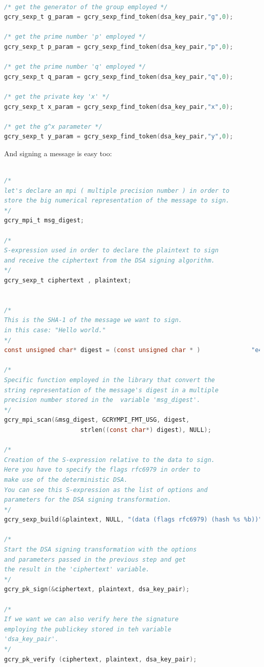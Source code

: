 \documentclass[11pt,english]{article}
\begin{document}
\begin{lstlisting}[language=c]

/* get the generator of the group employed */
gcry_sexp_t g_param = gcry_sexp_find_token(dsa_key_pair,"g",0);

/* get the prime number 'p' employed */
gcry_sexp_t p_param = gcry_sexp_find_token(dsa_key_pair,"p",0); 

/* get the prime number 'q' employed */
gcry_sexp_t q_param = gcry_sexp_find_token(dsa_key_pair,"q",0);

/* get the private key 'x' */
gcry_sexp_t x_param = gcry_sexp_find_token(dsa_key_pair,"x",0);

/* get the g^x parameter */
gcry_sexp_t y_param = gcry_sexp_find_token(dsa_key_pair,"y",0);

\end{lstlisting}

And signing a message is easy too:

\begin{lstlisting}[language=c]

/* 
let's declare an mpi ( multiple precision number ) in order to 
store the big numerical representation of the message to sign.
*/
gcry_mpi_t msg_digest;

/*
S-expression used in order to declare the plaintext to sign
and receive the ciphertext from the DSA signing algorithm.
*/
gcry_sexp_t ciphertext , plaintext;


/* 
This is the SHA-1 of the message we want to sign. 
in this case: "Hello world."
*/    
const unsigned char* digest = (const unsigned char * )         		"e44f3364019d18a151cab7072b5a40bb5b3e274f";
    
/*
Specific function employed in the library that convert the 
string representation of the message's digest in a multiple 
precision number stored in the  variable 'msg_digest'.
*/    
gcry_mpi_scan(&msg_digest, GCRYMPI_FMT_USG, digest, 
                     strlen((const char*) digest), NULL);

/*
Creation of the S-expression relative to the data to sign.
Here you have to specify the flags rfc6979 in order to 
make use of the deterministic DSA.
You can see this S-expression as the list of options and
parameters for the DSA signing transformation.
*/  
gcry_sexp_build(&plaintext, NULL, "(data (flags rfc6979) (hash %s %b))" , "sha1", 20 , msg_digest);

/*
Start the DSA signing transformation with the options
and parameters passed in the previous step and get
the result in the 'ciphertext' variable.
*/
gcry_pk_sign(&ciphertext, plaintext, dsa_key_pair);

/*
If we want we can also verify here the signature
employing the publickey stored in teh variable
'dsa_key_pair'.
*/
gcry_pk_verify (ciphertext, plaintext, dsa_key_pair);

\end{lstlisting}
\end{document}
